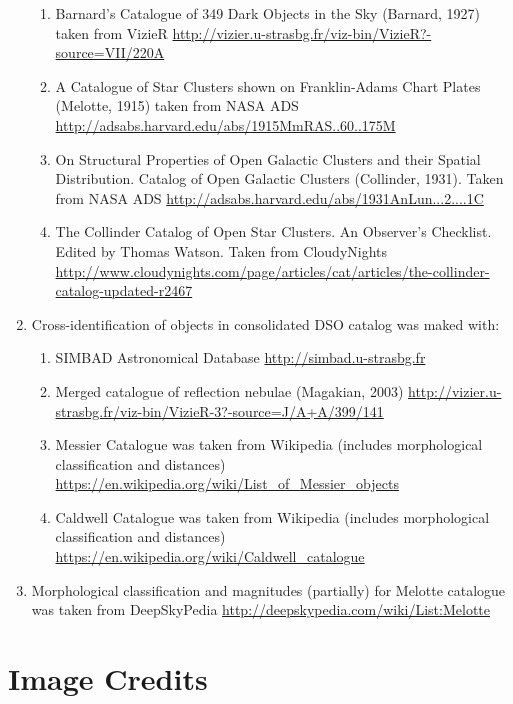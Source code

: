 \begin{enumerate}
\begin{enumerate}
     \item Barnard's Catalogue of 349 Dark Objects in the Sky    (Barnard, 1927)       taken from VizieR \url{http://vizier.u-strasbg.fr/viz-bin/VizieR?-source=VII/220A}
     \item A Catalogue of Star Clusters shown on Franklin-Adams Chart Plates (Melotte, 1915) taken from NASA ADS \url{http://adsabs.harvard.edu/abs/1915MmRAS..60..175M}
     \item On Structural Properties of Open Galactic Clusters and their Spatial Distribution. Catalog of Open Galactic Clusters (Collinder, 1931). 
	       Taken from NASA ADS \url{http://adsabs.harvard.edu/abs/1931AnLun...2....1C}
     \item The Collinder Catalog of Open Star Clusters. An Observer’s Checklist. Edited by Thomas Watson. 
	       Taken from CloudyNights \url{http://www.cloudynights.com/page/articles/cat/articles/the-collinder-catalog-updated-r2467}
	\end{enumerate}
\item Cross-identification of objects in consolidated DSO catalog was maked with:
	\begin{enumerate}
    \item  SIMBAD Astronomical Database \url{http://simbad.u-strasbg.fr}
    \item  Merged catalogue of reflection nebulae (Magakian, 2003) \url{http://vizier.u-strasbg.fr/viz-bin/VizieR-3?-source=J/A+A/399/141}
    \item  Messier  Catalogue was taken from Wikipedia (includes morphological classification and distances) \url{https://en.wikipedia.org/wiki/List_of_Messier_objects}
    \item  Caldwell Catalogue was taken from Wikipedia (includes morphological classification and distances) \url{https://en.wikipedia.org/wiki/Caldwell_catalogue}
	\end{enumerate}
\item Morphological classification and magnitudes (partially) for Melotte catalogue was taken from DeepSkyPedia \url{http://deepskypedia.com/wiki/List:Melotte}

\end{enumerate}


\section{Image Credits}
\label{sec:ack:images}

